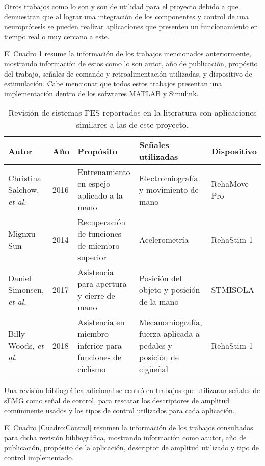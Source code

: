 Otros trabajos como lo son \cite{Simonsen2017} y \cite{Woods2018} son de utilidad para el proyecto debido a que demuestran que al lograr una integración de los componentes y control de una neuroprótesis se pueden realizar aplicaciones que presenten un funcionamiento en tiempo real o muy cercano a este.

El Cuadro \ref{Cuadro:Sistemas FES} resume la información de los trabajos mencionados anteriormente, mostrando información de estos como lo son autor, año de publicación, propósito del trabajo, señales de comando y retroalimentación utilizadas, y dispositivo de estimulación. Cabe mencionar que todos estos trabajos presentan una implementación dentro de los sofwtares MATLAB y Simulink.

\begin{table}[hbt]
	\centering
	\begin{tabular}{|p{30mm}|p{10mm}|p{40mm}|p{40mm}|p{25mm}|}
	\hline
	\textbf{Autor} & \textbf{Año} & \textbf{Propósito} & \textbf{Señales utilizadas} & \textbf{Dispositivo}\\ 
	\hline
	\hline
	Christina Salchow, \emph{et al.} \cite{Salchow2016} & 2016 & Entrenamiento en espejo aplicado a la mano & Electromiografía y movimiento de mano & RehaMove Pro\\
	\hline
	Mignxu Sun \cite{Sun2014} & 2014 & Recuperación de funciones de miembro superior & Acelerometría & RehaStim 1\\
	\hline
	Daniel Simonsen, \emph{et al.} \cite{Simonsen2017} & 2017 & Asistencia para apertura y cierre de mano & Posición del objeto y posición de la mano & STMISOLA\\
	\hline
	Billy Woods, \emph{et al.} \cite{Woods2018} & 2018 & Asistencia en miembro inferior para funciones de ciclismo & Mecanomiografía, fuerza aplicada a pedales y posición de cigüeñal & RehaStim 1\\
	\hline
	\end{tabular}
	\caption{Revisión de sistemas FES reportados en la literatura con aplicaciones similares a las de este proyecto.}
	\label{Cuadro:Sistemas FES}
\end{table}

Una revisión bibliográfica adicional se centró en trabajos que utilizaran señales de sEMG como señal de control, para rescatar los descriptores de amplitud comúnmente usados y los tipos de control utilizados para cada aplicación.

El Cuadro \ref{Cuadro:Control} resumen la información de los trabajos consultados para dicha revisión bibliográfica, mostrando información como aautor, año de publicación, propósito de la aplicación, descriptor de amplitud utilizado y tipo de control implementado.

